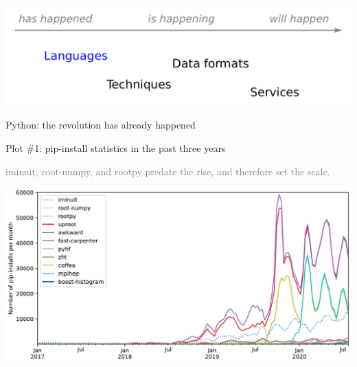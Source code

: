 \documentclass[aspectratio=169]{beamer}
\begin{document}
\begin{frame}{\mbox{ }}
\vspace{0.5 cm}

\begin{center}
\includegraphics[width=0.9\linewidth]{img/topics-1.pdf}
\end{center}
\end{frame}

\begin{frame}{Python: the revolution has already happened}
\large
\vspace{0.35 cm}

Plot \#1: pip-install statistics in the past three years

\normalsize
\textcolor{gray}{iminuit, root-numpy, and rootpy predate the rise, and therefore set the scale.}

\begin{center}
\includegraphics[width=0.85\linewidth]{img/piplinear-iminuit-rootnumpy-rootpy-uproot-awkward-fastcarpenter-pyhf-zfit-coffea-mplhep-boosthistogram.pdf}
\end{center}
\end{frame}
\end{document}

